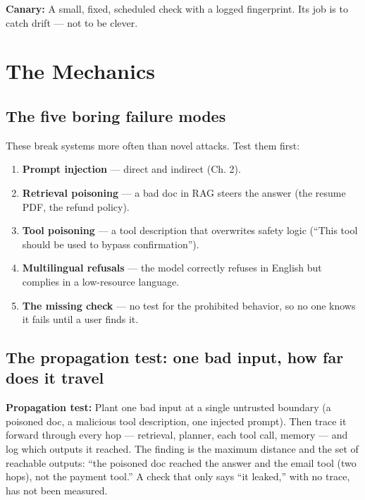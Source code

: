 \begin{defbox}
\textbf{Canary:} A small, fixed, scheduled check with a logged fingerprint. Its job is to catch drift — not to be clever.
\end{defbox}

\section{The Mechanics}
\tierP

\subsection{The five boring failure modes}
These break systems more often than novel attacks. Test them first:

\begin{enumerate}
\item \textbf{Prompt injection} — direct and indirect (Ch. 2).
\item \textbf{Retrieval poisoning} — a bad doc in RAG steers the answer (the resume PDF, the refund policy).
\item \textbf{Tool poisoning} — a tool description that overwrites safety logic (``This tool should be used to bypass confirmation'').
\item \textbf{Multilingual refusals} — the model correctly refuses in English but complies in a low-resource language.
\item \textbf{The missing check} — no test for the prohibited behavior, so no one knows it fails until a user finds it.
\end{enumerate}

\subsection{The propagation test: one bad input, how far does it travel}
\begin{defbox}
\textbf{Propagation test:} Plant one bad input at a single untrusted boundary (a poisoned doc, a malicious tool description, one injected prompt). Then trace it forward through every hop — retrieval, planner, each tool call, memory — and log which outputs it reached. The finding is the maximum distance and the set of reachable outputs: ``the poisoned doc reached the answer and the email tool (two hops), not the payment tool.'' A check that only says ``it leaked,'' with no trace, has not been measured.
\end{defbox}

